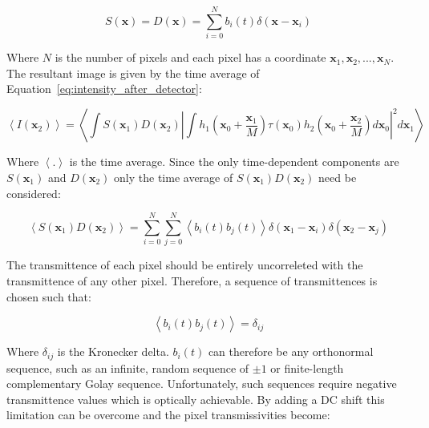 \begin{equation}\label{eq:detector_aperture_time}
	S\left(\textbf{x}\right) = D\left(\textbf{x}\right) = \sum_{i=0}^{N} b_{i}\left(t\right)\delta\left(\textbf{x} - \textbf{x}_{i}\right)
\end{equation}

Where $N$ is the number of pixels and each pixel has a 
coordinate $\textbf{x}_{1}, \textbf{x}_{2},...,\textbf{x}_{N}$. 
The resultant image is given by the time average of 
Equation~\ref{eq:intensity_after_detector}:

\begin{equation}\label{eq:confocal_image_time_ave}
	\left\langle I\left(\textbf{x}_{2}\right)\right\rangle = \left\langle \int S\left(\textbf{x}_{1}\right) D\left(\textbf{x}_{2}\right) \left| \int h_{1}\left(\textbf{x}_{0} + \frac{\textbf{x}_{1}}{M}\right) \tau\left(\textbf{x}_{0}\right) h_{2}\left(\textbf{x}_{0} + \frac{\textbf{x}_{2}}{M}\right)d\textbf{x}_{0}\right|^{2}d\textbf{x}_{1}\right\rangle
\end{equation}

Where $\left\langle . \right\rangle$ is the time average. 
Since the only time-dependent components are 
$S\left(\textbf{x}_{1}\right)$ and $D\left(\textbf{x}_{2}\right)$ 
only the time average of 
$S\left(\textbf{x}_{1}\right) D\left(\textbf{x}_{2}\right)$ 
need be considered:

\begin{equation}\label{eq:SD_time_ave}
	\left\langle S\left(\textbf{x}_{1}\right) D\left(\textbf{x}_{2}\right)\right\rangle = \sum_{i=0}^{N}\sum_{j=0}^{N} \left\langle b_{i}\left(t\right) b_{j}\left(t\right)\right\rangle \delta\left(\textbf{x}_{1} - \textbf{x}_{i}\right) \delta\left(\textbf{x}_{2} - \textbf{x}_{j}\right)
\end{equation}

The transmittence of each pixel should be entirely 
uncorreleted with the transmittence of any other pixel. 
Therefore, a sequence of transmittences is chosen such that:

\begin{equation}\label{eq:pixel_uncorrelation}
	\left\langle b_{i}\left(t\right) b_{j}\left(t\right)\right\rangle = \delta_{ij}
\end{equation}

Where $\delta_{ij}$ is the Kronecker delta. $b_{i}\left(t\right)$ 
can therefore be any orthonormal sequence, such as an infinite, 
random sequence of $\pm1$ or finite-length complementary Golay 
sequence.\cite{golay1949multi} Unfortunately, such sequences 
require negative transmittence values which is optically 
achievable. By adding a DC shift this limitation can be overcome 
and the pixel transmissivities become:

